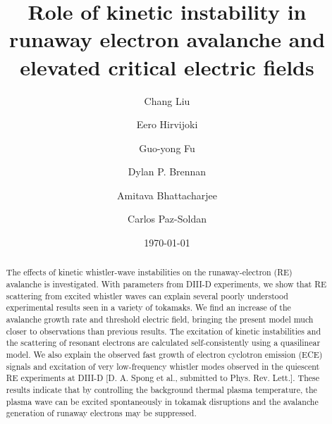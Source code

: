 \documentclass[aps, prl, preprint,english,superscriptaddress]{revtex4-1}
\begin{document}
\title{Role of kinetic instability in runaway electron avalanche and elevated critical electric fields}

\author{Chang Liu}
\author{Eero Hirvijoki}
\author{Guo-yong Fu}
\author{Dylan P. Brennan}
\author{Amitava Bhattacharjee}
\author{Carlos Paz-Soldan}

\date{\today}

\begin{abstract}

The effects of kinetic whistler-wave instabilities on the runaway-electron (RE) avalanche is investigated. With parameters from DIII-D experiments, we show that RE scattering from excited whistler waves can explain several poorly understood experimental results seen in a variety of tokamaks. We find an increase of the avalanche growth rate and threshold electric field, bringing the present model much closer to observations than previous results. The excitation of kinetic instabilities and the scattering of resonant electrons are calculated self-consistently using a quasilinear model. We also explain the observed fast growth of electron cyclotron emission (ECE) signals and excitation of very low-frequency whistler modes observed in the quiescent RE experiments at DIII-D [D. A. Spong et al., submitted to Phys. Rev. Lett.]. These results indicate that by controlling the background thermal plasma temperature, the plasma wave can be excited spontaneously in tokamak disruptions and the avalanche generation of runaway electrons may be suppressed. 

\end{abstract}

\maketitle
\end{document}
